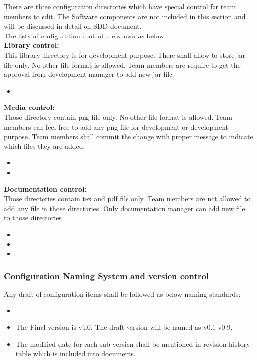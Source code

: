There are three configuration directories which have special control for team members to edit. The Software components are not included in this section and will be discussed in detail on SDD document.\\
The lists of configuration control are shown as below:\\

\textbf{Library control:}\\
This library directory is for development purpose. There shall allow to store jar file only. No other file format is allowed. Team members are require to get the approval from development manager to add new jar file.\\ 
\begin{itemize}
	\item \texttt{}
\end{itemize}
\textbf{Media control:}\\
Those directory contain png file only. No other file format is allowed. Team members can feel free to add any png file for development or development purpose. Team members shall commit the change with proper message to indicate which files they are added.

\begin{itemize}
	\item \texttt{}
	\item \texttt{}
\end{itemize} 
\textbf{Documentation control:}\\
Those directories contain tex and pdf file only. Team members are not allowed to add any file in those directories.
Only documentation manager can add new file to those directories

\begin{itemize}
	\item \texttt{}
	\item \texttt{}
	\item \texttt{}
\end{itemize}

\subsubsection{Configuration Naming System and version control}
Any draft of configuration items shall be followed as below naming standards:
\begin{itemize}
	\item \texttt{}\\
      		\texttt{}
	\item The Final version is v1.0. The draft version will be named as v0.1-v0.9.
	\item The modified date for each sub-version shall be mentioned in revision history table which is included into documents.\\
\end{itemize}

